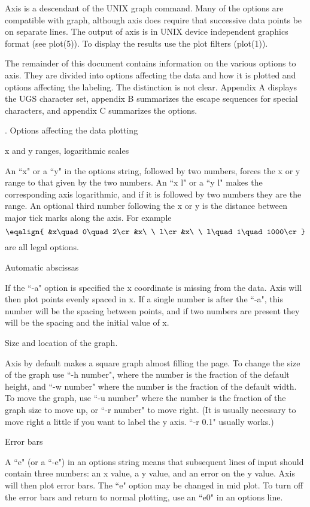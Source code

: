 Axis is a descendant of the UNIX graph command.  Many of the options are
compatible with graph, although axis does require that successive data
points be on separate lines.  The output of axis is in UNIX device
independent graphics format (see plot(5)). To display the results use
the plot filters (plot(1)).

The remainder of this document contains information on the various
options to axis.  They are divided into options affecting the data and
how it is plotted and options affecting the labeling.  The distinction
is not clear.  Appendix A displays the UGS character set, appendix B
summarizes the escape sequences for special characters, and appendix C
summarizes the options.

.  Options affecting the data plotting

 x and y ranges, logarithmic scales

An ``x" or a ``y" in the options string, followed by two numbers, forces the
x or y range to that given by the two numbers.  An ``x l" or a ``y l"
makes the corresponding axis logarithmic, and if it is followed
by two numbers they are the range.
An optional third number following the x or y is the distance
between major tick marks along the axis.
For example
$$\eqalign{
&x\quad 0\quad 2\cr
&x\ \ l\cr
&x\ \ l\quad 1\quad 1000\cr
}$$
are all legal options.

 Automatic abscissas

If the ``-a" option is specified the x coordinate is missing from
the data.  Axis will then plot points evenly spaced in x.  If a single
number is after the ``-a", this number will be the spacing between
points, and if two numbers are present they will be the spacing
and the initial value of x.

 Size and location of the graph.

Axis by default makes a square graph almost filling the page.
To change the size of the graph use ``-h number", where the number is
the fraction of the default height, and ``-w number" where the number
is the fraction of the default width.
To move the graph, use ``-u number" where the number is the fraction
of the graph size to move up, or ``-r number" to move right.
(It is usually necessary to move right a little if you want to
label the y axis. ``-r 0.1" usually works.)

 Error bars

A ``e" (or a ``-e") in an options string means that subsequent lines of
input should contain three numbers: an x value, a y value, and an error
on the y value.  Axis will then plot error bars.  The ``e" option may
be changed in mid plot.  To turn off the
error bars and return to normal plotting, use an ``e0" in an options
line.


